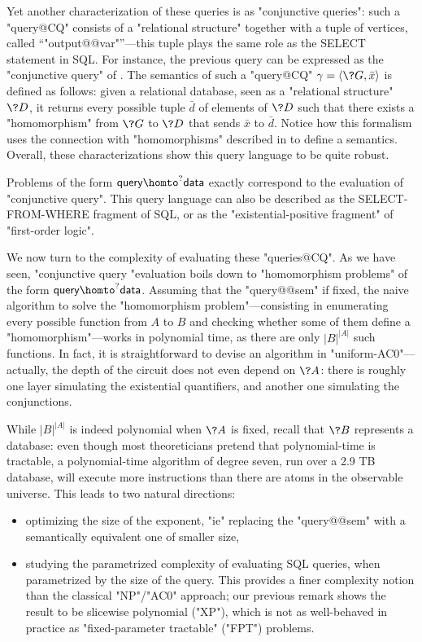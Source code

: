 Yet another characterization of these queries is as "conjunctive queries": such a "query@CQ"
consists of a "relational structure" together with a tuple of vertices, called ``"output@@var"''---this tuple
plays the same role as the \textsf{SELECT} statement in SQL.
For instance, the previous query can be expressed as the "conjunctive query"
of . The semantics of such a "query@CQ"
$\gamma = \tup{\?G, \bar x}$ is defined as follows:
given a relational database, seen as a "relational structure" $\?D$,
it returns every possible tuple $\bar d$ of elements of $\?D$ such that
there exists a "homomorphism" from $\?G$ to $\?D$ that sends $\bar x$ to $\bar d$.
Notice how this formalism uses the connection with "homomorphisms"
described in  to define a semantics.
Overall, these characterizations show this query language to be quite robust.

\begin{known}
	Problems of the form $\textsf{query} \homto^? \textsf{data}$
	exactly correspond to the evaluation of "conjunctive query". This
	query language can also be described as the
	\textsf{SELECT-FROM-WHERE} fragment of SQL, or as the "existential-positive
	fragment" of "first-order logic".
\end{known}

We now turn to the complexity of evaluating these "queries@CQ".
As we have seen, "conjunctive query "evaluation boils down to
"homomorphism problems" of the form $\textsf{query} \homto^? \textsf{data}$.
Assuming that the "query@@sem" if fixed,
the naive algorithm to solve the "homomorphism problem"---consisting in enumerating
every possible function from $A$ to $B$ and checking whether some of them
define a "homomorphism"---works in polynomial time, as there are only $|B|^{|A|}$ such functions.
In fact, it is straightforward to devise an algorithm in "uniform-AC0"---actually, the depth
of the circuit does not even depend on $\?A$: there is roughly one layer simulating the
existential quantifiers, and another one simulating the conjunctions.

While $|B|^{|A|}$ is indeed polynomial when $\?A$ is fixed,
recall that $\?B$ represents a database:
even though most theoreticians pretend that polynomial-time is tractable,
a polynomial-time algorithm of degree seven,
run over a 2.9 TB database, will execute more instructions
than there are atoms in the observable universe.
This leads to two natural directions:
\begin{itemize}
	\item optimizing the size of the exponent, "ie"
		replacing the "query@@sem" with a semantically equivalent one of smaller size,
	\item studying the parametrized complexity of evaluating SQL queries, when parametrized by
		the size of the query. This provides a finer complexity notion than
		the classical "NP"/"AC0" approach; our previous remark shows the result to be
		slicewise polynomial ("XP"), which is not as well-behaved in practice as
		"fixed-parameter tractable" ("FPT") problems.
\end{itemize}

